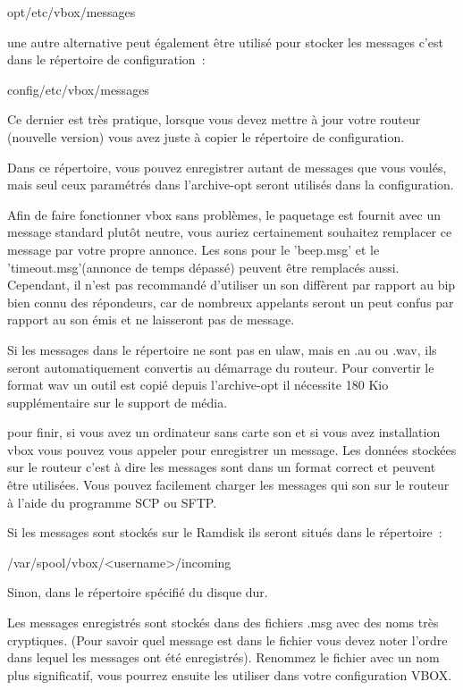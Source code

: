 opt/etc/vbox/messages

une autre alternative peut également être utilisé pour stocker les messages c'est dans le répertoire
de configuration~:

config/etc/vbox/messages

Ce dernier est très pratique, lorsque vous devez mettre à jour votre routeur (nouvelle version) vous avez
juste à copier le répertoire de configuration.

Dans ce répertoire, vous pouvez enregistrer autant de messages que vous voulés, mais seul ceux paramétrés
dans l'archive-opt seront utilisés dans la configuration.

Afin de faire fonctionner vbox sans problèmes, le paquetage est fournit avec un message standard plutôt
neutre, vous auriez certainement souhaitez remplacer ce message par votre propre annonce. Les sons pour
le 'beep.msg' et le 'timeout.msg'(annonce de temps dépassé) peuvent être remplacés aussi. Cependant, il
n'est pas recommandé d'utiliser un son diffèrent par rapport au bip bien connu des répondeurs, car de
nombreux appelants seront un peut confus par rapport au son émis et ne laisseront pas de message.

Si les messages dans le répertoire ne sont pas en ulaw, mais en .au ou .wav, ils seront automatiquement
convertis au démarrage du routeur. Pour convertir le format wav un outil est copié depuis l'archive-opt
il nécessite 180 Kio supplémentaire sur le support de média.

pour finir, si vous avez un ordinateur sans carte son et si vous avez installation vbox vous pouvez
vous appeler pour enregistrer un message. Les données stockées sur le routeur c'est à dire les messages
sont dans un format correct et peuvent être utilisées. Vous pouvez facilement charger les messages qui
son sur le routeur à l'aide du programme SCP ou SFTP.

Si les messages sont stockés sur le Ramdisk ils seront situés dans le répertoire~:

/var/spool/vbox/<username>/incoming

Sinon, dans le répertoire spécifié du disque dur.

Les messages enregistrés sont stockés dans des fichiers .msg avec des noms très cryptiques.
(Pour savoir quel message est dans le fichier vous devez noter l'ordre dans lequel les messages
ont été enregistrés). Renommez le fichier avec un nom plus significatif, vous pourrez ensuite les
utiliser dans votre configuration VBOX.

